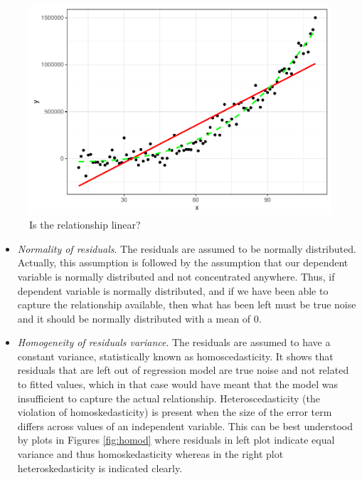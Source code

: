 \documentclass[
]{book}
\begin{document}
\begin{figure}

{\centering \includegraphics[width=0.5\linewidth]{DauR_files/figure-latex/linearity-1} 

}

\caption{Is the relationship linear?}\label{fig:linearity}
\end{figure}

\begin{itemize}
\item
  \emph{Normality of residuals}. The residuals are assumed to be normally distributed. Actually, this assumption is followed by the assumption that our dependent variable is normally distributed and not concentrated anywhere. Thus, if dependent variable is normally distributed, and if we have been able to capture the relationship available, then what has been left must be true noise and it should be normally distributed with a mean of \(0\).
\item
  \emph{Homogeneity of residuals variance}. The residuals are assumed to have a constant variance, statistically known as homoscedasticity. It shows that residuals that are left out of regression model are true noise and not related to fitted values, which in that case would have meant that the model was insufficient to capture the actual relationship. Heteroscedasticity (the violation of homoskedasticity) is present when the size of the error term differs across values of an independent variable. This can be best understood by plots in Figures \ref{fig:homod} where residuals in left plot indicate equal variance and thus homoskedasticity whereas in the right plot heteroskedasticity is indicated clearly.
\end{itemize}
\end{document}
